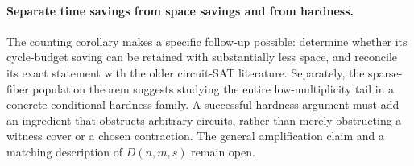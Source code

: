 \documentclass[11pt]{article}
\theoremstyle{definition}
\theoremstyle{remark}
\begin{document}
\paragraph{Separate time savings from space savings and from hardness.}
The counting corollary makes a specific follow-up possible: determine
whether its cycle-budget saving can be retained with substantially
less space, and reconcile its exact statement with the older circuit-SAT
literature. Separately, the sparse-fiber population theorem suggests
studying the entire low-multiplicity tail in a concrete conditional
hardness family. A successful hardness argument must add an ingredient
that obstructs arbitrary circuits, rather than merely obstructing a
witness cover or a chosen contraction. The general amplification claim
and a matching description of $D(n,m,s)$ remain open.

\appendix



\setlength{\bibsep}{3pt plus 1pt minus 1pt}


\end{document}

